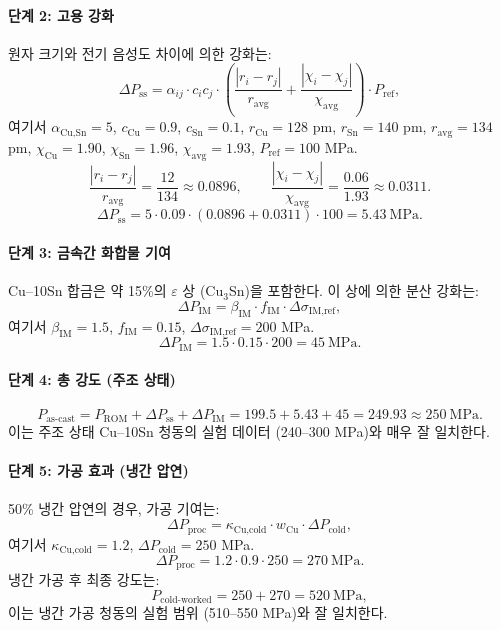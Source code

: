 \documentclass[12pt,a4paper]{article}
\begin{document}
	\paragraph{단계 2: 고용 강화}
	원자 크기와 전기 음성도 차이에 의한 강화는:
	\[
	\Delta P_{\text{ss}} = \alpha_{ij} \cdot c_i c_j \cdot \left( \frac{|r_i - r_j|}{r_{\text{avg}}} + \frac{|\chi_i - \chi_j|}{\chi_{\text{avg}}} \right) \cdot P_{\text{ref}},
	\]
	여기서 \(\alpha_{\text{Cu,Sn}} = 5\), \(c_{\text{Cu}}=0.9\), \(c_{\text{Sn}}=0.1\), \(r_{\text{Cu}}=128\) pm, \(r_{\text{Sn}}=140\) pm, \(r_{\text{avg}}=134\) pm, \(\chi_{\text{Cu}}=1.90\), \(\chi_{\text{Sn}}=1.96\), \(\chi_{\text{avg}}=1.93\), \(P_{\text{ref}} = 100\) MPa.
	\[
	\frac{|r_i - r_j|}{r_{\text{avg}}} = \frac{12}{134} \approx 0.0896, \qquad
	\frac{|\chi_i - \chi_j|}{\chi_{\text{avg}}} = \frac{0.06}{1.93} \approx 0.0311.
	\]
	\[
	\Delta P_{\text{ss}} = 5 \cdot 0.09 \cdot (0.0896 + 0.0311) \cdot 100 = 5.43\ \text{MPa}.
	\]
	
	\paragraph{단계 3: 금속간 화합물 기여}
	Cu–10Sn 합금은 약 15\%의 \(\varepsilon\) 상 (Cu\(_3\)Sn)을 포함한다. 이 상에 의한 분산 강화는:
	\[
	\Delta P_{\text{IM}} = \beta_{\text{IM}} \cdot f_{\text{IM}} \cdot \Delta \sigma_{\text{IM,ref}},
	\]
	여기서 \(\beta_{\text{IM}} = 1.5\), \(f_{\text{IM}} = 0.15\), \(\Delta \sigma_{\text{IM,ref}} = 200\) MPa.
	\[
	\Delta P_{\text{IM}} = 1.5 \cdot 0.15 \cdot 200 = 45\ \text{MPa}.
	\]
	
	\paragraph{단계 4: 총 강도 (주조 상태)}
	\[
	P_{\text{as-cast}} = P_{\text{ROM}} + \Delta P_{\text{ss}} + \Delta P_{\text{IM}} = 199.5 + 5.43 + 45 = 249.93 \approx 250\ \text{MPa}.
	\]
	이는 주조 상태 Cu–10Sn 청동의 실험 데이터 (240–300 MPa)와 매우 잘 일치한다.
	
	\paragraph{단계 5: 가공 효과 (냉간 압연)}
	50\% 냉간 압연의 경우, 가공 기여는:
	\[
	\Delta P_{\text{proc}} = \kappa_{\text{Cu,cold}} \cdot w_{\text{Cu}} \cdot \Delta P_{\text{cold}},
	\]
	여기서 \(\kappa_{\text{Cu,cold}} = 1.2\), \(\Delta P_{\text{cold}} = 250\) MPa.
	\[
	\Delta P_{\text{proc}} = 1.2 \cdot 0.9 \cdot 250 = 270\ \text{MPa}.
	\]
	냉간 가공 후 최종 강도는:
	\[
	P_{\text{cold-worked}} = 250 + 270 = 520\ \text{MPa},
	\]
	이는 냉간 가공 청동의 실험 범위 (510–550 MPa)와 잘 일치한다.
	
\end{document}
